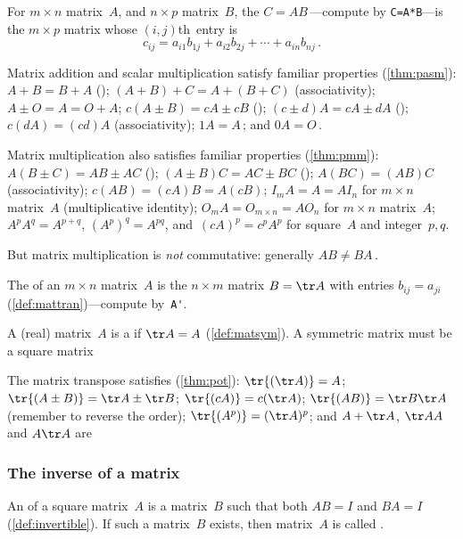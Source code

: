 \begin{itemize}
\begin{itemize}
\itemhi For \(m\times n\) matrix~\(A\), and \(n\times p\) matrix~\(B\), the  \(C=AB\)\,---compute by \verb|C=A*B|---is the \(m\times p\) matrix whose \((i,j)\)th~entry is
\begin{equation*}
c_{ij}=a_{i1}b_{1j}+a_{i2}b_{2j}+\cdots+a_{in}b_{nj}\,.
\end{equation*}

\end{itemize}

\itemme Matrix addition and scalar multiplication satisfy familiar properties (\cref{thm:pasm}): 
 \(A+B=B+A\) ();
 \((A+B)+C=A+(B+C)\) (associativity);
 \(A\pm O=A=O+A\);
 \(c(A\pm B)=cA\pm cB\) ();
 \((c\pm d)A=cA\pm dA\) ();
 \(c(dA)=(cd)A\) (associativity);
 \(1A=A\)\,; and 
 \(0A=O\)\,.
 
\itemme Matrix multiplication also satisfies familiar properties (\cref{thm:pmm}):
 \(A(B\pm C)=AB\pm AC\) ();
 \((A\pm B)C=AC\pm BC\) ();
 \(A(BC)=(AB)C\) (associativity);
 \(c(AB)=(cA)B=A(cB)\);
 \(I_mA=A=AI_n\) for \(m\times n\) matrix~\(A\) (multiplicative identity);
 \(O_mA=O_{m\times n}=AO_n\)  for \(m\times n\) matrix~\(A\);
 \(A^pA^q=A^{p+q}\), \((A^p)^q=A^{pq}\), and~\((cA)^p=c^pA^p\) for square~\(A\) and integer~\(p,q\).
 
But matrix multiplication is \emph{not} commutative: generally \(AB\neq BA\)\,.

\itemhi The  of an \(m\times n\) matrix~\(A\) is the \(n\times m\) matrix \(B=\tr A\) with entries \(b_{ij}=a_{ji}\) (\cref{def:mattran})---compute by~\verb|A'|.

A (real) matrix~\(A\) is a  if \(\tr A=A\) (\cref{def:matsym}).
A symmetric matrix must be a square matrix

\itemme The matrix transpose satisfies (\cref{thm:pot}):
\(\tr{(\tr A)}=A\);
\(\tr{(A\pm B)}=\tr A\pm \tr B\);
\(\tr{(cA)}=c(\tr A)\);
\(\tr{(AB)}=\tr B\tr A\) (remember to reverse the order);
\(\tr{(A^p)}=(\tr A)^p\);
and \(A+\tr A\),  \(\tr AA\) and \(A\tr A\) are 





\subsubsection{The inverse of a matrix}

\itemhi An  of a square matrix~\(A\) is a matrix~\(B\) such that both \(AB=I\) and \(BA=I\) (\cref{def:invertible}).
If such a matrix~\(B\) exists, then matrix~\(A\) is called .


\end{itemize}
